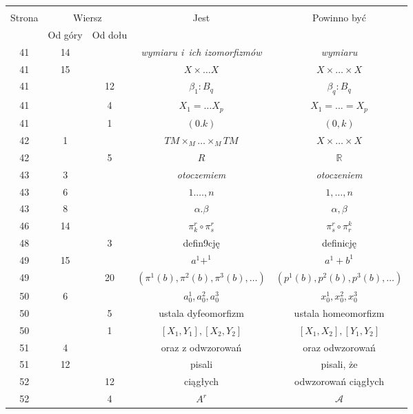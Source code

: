 \documentclass[a4paper,11pt]{article}
\newcommand{\mb}{\mathbb}
\newcommand{\mc}{\mathcal}
\newcommand{\ld}{\ldots}
\newcommand{\ti}{\times}
\newcommand{\al}{\alpha}
\newcommand{\be}{\beta}
\newcommand{\R}{\mb{R}}
\newcommand{\A}{\mc{A}}
\begin{document}
\begin{center}
  \begin{tabular}{|c|c|c|c|c|}
    \hline
    & \multicolumn{2}{c|}{} & & \\
    Strona & \multicolumn{2}{c|}{Wiersz} & Jest
                              & Powinno być \\ \cline{2-3}
    & Od góry & Od dołu &  &  \\ \hline
    41 & 14 & & \emph{wymiaru i~ich izomorfizmów} & \emph{wymiaru} \\
    41 & 15 & & $X \ti \ld X$ & $X \ti \ld \ti X$ \\
    41 & & 12 & $\be_{ 1 } : B_{ q }$ & $\be_{ q } : B_{ q }$ \\
    41 & &  4 & $X_{ 1 } = \ld X_{ p }$ & $X_{ 1 } = \ld = X_{ p }$ \\
    41 & &  1 & $( 0. k )$ & $( 0, k )$ \\
    42 & 1 & & $TM \ti_{ M } \ld \ti_{ M } TM$ & $X \ti \ld \ti X$ \\
    42 & & 5 & $R$ & $\R$ \\
    43 &  3 & & \emph{otoczemiem} & \emph{otoczeniem} \\
    43 &  6 & & $1 . \ld, n$ & $1, \ld, n$ \\
    43 &  8 & & $\al. \be$ & $\al, \be$ \\
    46 & 14 & & $\pi_{ k }^{ r } \circ \pi^{ r }_{ s }$
           & $\pi_{ s }^{ r } \circ \pi^{ k }_{ r }$ \\
    48 & & 3 & defin9cję & definicję \\
    49 & 15 & & $a^{ 1 } + ^{ 1 }$ & $a^{ 1 } + b^{ 1 }$ \\
    49 & & 20 & $( \pi^{ 1 } ( b ), \pi^{ 2 } ( b ), \pi^{ 3 } ( b ),
                \ld )$ & $( p^{ 1 } ( b ), p^{ 2 } ( b ),
                         p^{ 3 } ( b ), \ld )$ \\
    50 & 6 & & $a_{ 0 }^{ 1 }, a_{ 0 }^{ 2 }, a_{ 0 }^{ 3 }$
           & $x_{ 0 }^{ 1 }, x_{ 0 }^{ 2 }, x_{ 0 }^{ 3 }$ \\
    50 & & 5 & ustala dyfeomorfizm & ustala homeomorfizm \\
    50 & & 1 & $[ X_{ 1 }, Y_{ 1 }], [ X_{ 2 }, Y_{ 2 } ]$
           & $[ X_{ 1 }, X_{ 2 }], [ Y_{ 1 }, Y_{ 2 } ]$ \\
    51 &  4 & & oraz z odwzorowań & oraz odwzorowań \\
    51 & 12 & & pisali & pisali, że \\
    52 & & 12 & ciągłych & odwzorowań ciągłych \\
    52 & &  4 & $A^{ r }$ & $\A$ \\

\end{tabular}
\end{center}
\end{document}
